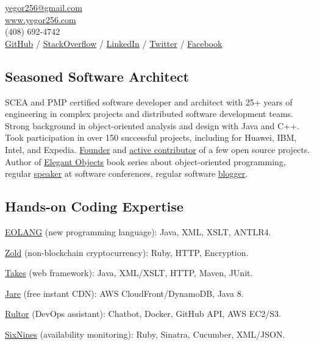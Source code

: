 

\href{mailto:yegor256@gmail.com}{yegor256@gmail.com}\\%
\href{https://www.yegor256.com}{www.yegor256.com}\\%
(408) 692-4742\\%
\href{https://github.com/yegor256}{GitHub} /
\href{https://stackexchange.com/users/63162/yegor256}{StackOverflow} /
\href{https://www.linkedin.com/in/yegor256}{LinkedIn} /
\href{https://twitter.com/intent/follow?screen_name=yegor256}{Twitter} /
\href{https://www.facebook.com/yegor256}{Facebook}

\subsection*{Seasoned Software Architect}

SCEA and PMP certified software developer and architect with
25+ years of engineering in complex projects and distributed software
development teams. Strong background in object-oriented analysis and design
with Java and C++. Took participation in over 150 successful projects,
including for Huawei, IBM, Intel, and Expedia. \href{https://www.yegor256.com/pets.html}{Founder}
and \href{https://github.com/yegor256}{active contributor} of
a few open source projects. Author of
\href{https://www.yegor256.com/elegant-objects.html}{Elegant Objects}
book series about object-oriented programming,
regular \href{https://www.yegor256.com/talks.html}{speaker} at software conferences, regular software
\href{https://www.yegor256.com}{blogger}.

\subsection*{Hands-on Coding Expertise}

\href{https://www.eolang.org}{EOLANG} (new programming language):
Java, XML, XSLT, ANTLR4.

\href{https://www.zold.io}{Zold} (non-blockchain cryptocurrency):
Ruby, HTTP, Encryption.

\href{https://www.takes.org}{Takes} (web framework):
Java, XML/XSLT, HTTP, Maven, JUnit.

\href{https://www.jare.io}{Jare} (free instant CDN):
AWS CloudFront/DynamoDB, Java 8.

\href{https://www.rultor.com}{Rultor} (DevOps assistant):
Chatbot, Docker, GitHub API, AWS EC2/S3.

\href{https://www.sixnines.io}{SixNines} (availability monitoring):
Ruby, Sinatra, Cucumber, XML/JSON.

